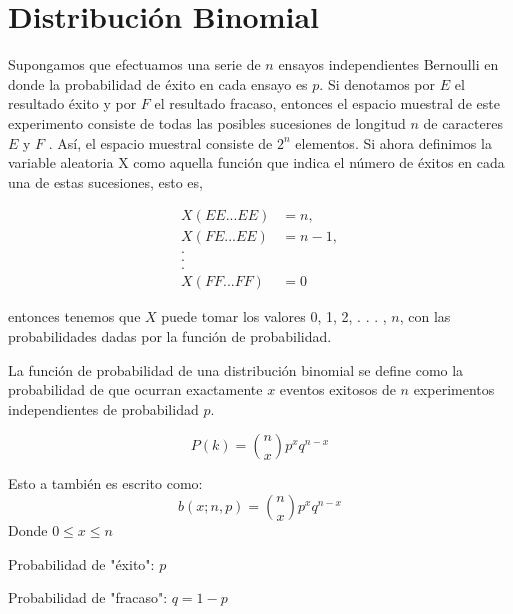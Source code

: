 \section{Distribución Binomial}

Supongamos que efectuamos una serie de $n$ ensayos independientes Bernoulli en
donde la probabilidad de éxito en cada ensayo es $p$. Si denotamos por $E$ el
resultado éxito y por $F$ el resultado fracaso, entonces el espacio muestral de
este experimento consiste de todas las posibles sucesiones de longitud $n$ de
caracteres $E$ y $F$ . Así, el espacio muestral consiste de $2^n$ elementos. Si
ahora definimos la variable aleatoria X como aquella función que indica el
número de éxitos en cada una de estas sucesiones, esto es,

\begin{equation}
    \begin{array}{ll}
        X(EE...EE) & = n, \\
        X(FE...EE) & = n-1, \\
        . & \\
        . & \\
        . & \\
        X(FF...FF) & = 0
    \end{array}
\end{equation}

entonces tenemos que $X$ puede tomar los valores 0, 1, 2, . . . , $n$, con las
probabilidades dadas por la función de probabilidad.

\begin{tcolorbox}[colback=gray!5!white,colframe=gray!60!black,title=Definición: Función de Distribución Binomial]
    La función de probabilidad de una distribución binomial se define como la
    probabilidad de que ocurran exactamente $x$ eventos exitosos de $n$ experimentos
    independientes de probabilidad $p$.

    \begin{equation}
      P(k) = \binom{n}{x} p^x q^{n-x}
    \end{equation}
    
    Esto a también es escrito como:
    \begin{equation}
      b(x; n,p) = \binom{n}{x} p^x q^{n-x}
    \end{equation}
    Donde $0 \leq x \leq n$

    Probabilidad de "éxito": $p$

    Probabilidad de "fracaso": $q = 1 - p$
\end{tcolorbox}

